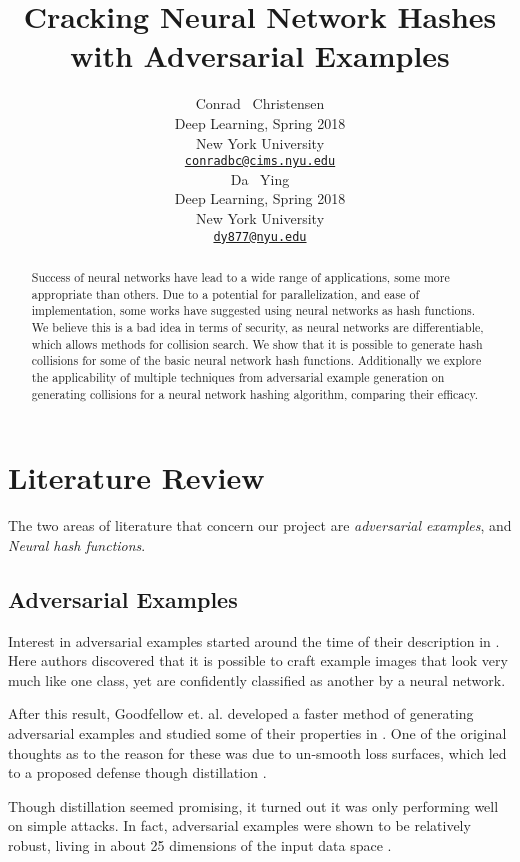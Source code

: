 \documentclass{article}
\title{Cracking Neural Network Hashes with Adversarial Examples}
\author{
  Conrad ~Christensen\\
  Deep Learning, Spring 2018\\
  New York University\\
  \href{mailto:conradbc@cims.nyu.edu}{\texttt{conradbc@cims.nyu.edu}} \\
  \And
  Da ~Ying\\
  Deep Learning, Spring 2018\\
  New York University\\
  \href{mailto:dy877@nyu.edu}{\texttt{dy877@nyu.edu}}
}
\begin{document}

\maketitle

\begin{abstract}
    Success of neural networks have lead to a wide range of applications, some
    more appropriate than others. Due to a potential for parallelization, and
    ease of implementation, some works have suggested using neural networks as
    hash functions.  We believe this is a bad idea in terms of security, as
    neural networks are differentiable, which allows methods for collision
    search. We show that it is possible to generate hash collisions for some of
    the basic neural network hash functions. Additionally we explore the
    applicability of multiple techniques from adversarial example generation on
    generating collisions for a neural network hashing algorithm, comparing
    their efficacy.
\end{abstract}

\section{Literature Review}

The two areas of literature that concern our project are \emph{adversarial examples},
and \emph{Neural hash functions}.

\subsection{Adversarial Examples}
Interest in adversarial examples started around the time of their description
in \cite{intriguing}. Here authors discovered that it is possible to craft
example images that look very much like one class, yet are confidently classified
as another by a neural network.

After this result, Goodfellow et. al. developed a faster method of generating
adversarial examples and studied some of their properties in \cite{explaining}.
One of the original thoughts as to the reason for these was due to un-smooth 
loss surfaces, which led to a proposed defense though distillation \cite{distil}.

Though distillation seemed promising, it turned out it was only performing well
on simple attacks. In fact, adversarial examples were shown to be relatively
robust, living in about 25 dimensions of the input data space \cite{space}.
\end{document}
